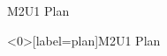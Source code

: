 \begin{frame}{M2U1 Plan}
	\tableofcontents
\end{frame}
%
%
\begin{frame}<0>[label=plan]{M2U1 Plan}
	\tableofcontents[currentsection]
\end{frame}